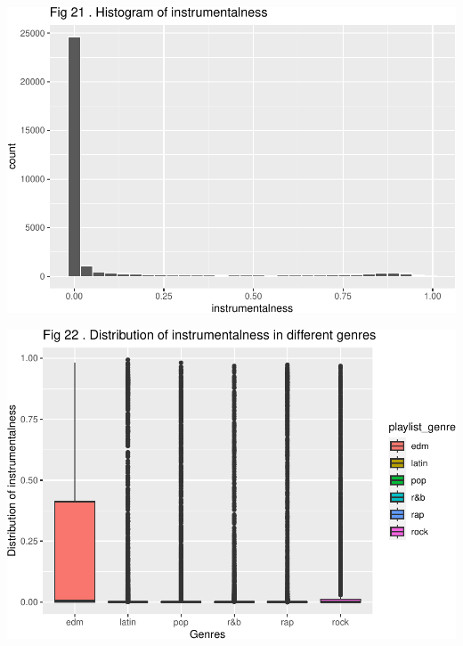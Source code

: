 \documentclass[
]{article}
\begin{document}
\includegraphics{Final-Report_files/figure-latex/unnamed-chunk-14-17.pdf}

\includegraphics{Final-Report_files/figure-latex/unnamed-chunk-14-18.pdf}
\end{document}
